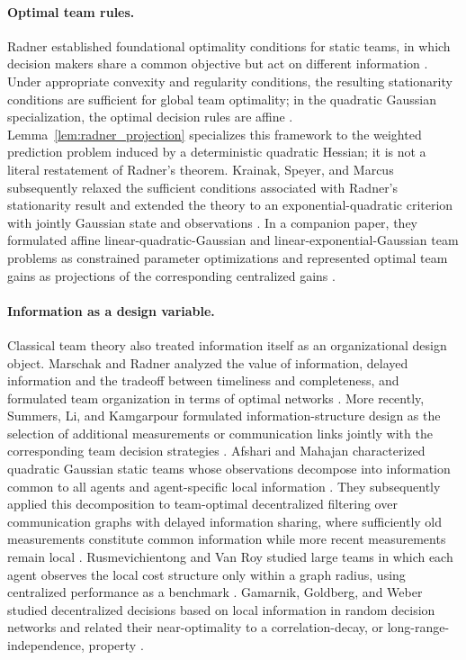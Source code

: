 \documentclass[11pt]{article}
\begin{document}
\paragraph{Optimal team rules.}
Radner established foundational optimality conditions for static teams, in which decision makers share a common objective but act on different information \cite{radner1962team}. Under appropriate convexity and regularity conditions, the resulting stationarity conditions are sufficient for global team optimality; in the quadratic Gaussian specialization, the optimal decision rules are affine \cite{radner1962team,marschak1972economic}. Lemma~\ref{lem:radner_projection} specializes this framework to the weighted
prediction problem induced by a deterministic quadratic Hessian; it is not a
literal restatement of Radner's theorem. Krainak, Speyer, and Marcus subsequently relaxed the sufficient conditions associated with Radner's stationarity result and extended the theory to an exponential-quadratic criterion with jointly Gaussian state and observations \cite{krainak1982staticI}. In a companion paper, they formulated affine linear-quadratic-Gaussian and linear-exponential-Gaussian team problems as constrained parameter optimizations and represented optimal team gains as projections of the corresponding centralized gains \cite{krainak1982staticII}.

\paragraph{Information as a design variable.}
Classical team theory also treated information itself as an organizational design object. Marschak and Radner analyzed the value of information, delayed information and the tradeoff between timeliness and completeness, and formulated team organization in terms of optimal networks \cite{marschak1972economic}. More recently, Summers, Li, and Kamgarpour formulated information-structure design as the selection of additional measurements or communication links jointly with the corresponding team decision strategies \cite{summers2017information}. Afshari and Mahajan characterized quadratic Gaussian static teams whose observations decompose into information common to all agents and agent-specific local information \cite{afshari2017static}. They subsequently applied this decomposition to team-optimal decentralized filtering over communication graphs with delayed information sharing, where sufficiently old measurements constitute common information while more recent measurements remain local \cite{afshari2018team}. Rusmevichientong and Van Roy studied large teams in which each agent observes the local cost structure only within a graph radius, using centralized performance as a benchmark \cite{rusmevichientong2003decentralized}. Gamarnik, Goldberg, and Weber studied decentralized decisions based on local information in random decision networks and related their near-optimality to a correlation-decay, or long-range-independence, property \cite{gamarnik2014correlation}.
\end{document}

